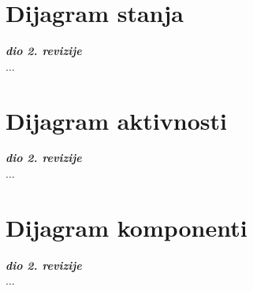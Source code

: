 			\eject
		
		\section{Dijagram stanja}
			
			
			\textbf{\textit{dio 2. revizije}}\\
			
			...
			
			
			\eject 
		
		\section{Dijagram aktivnosti}
			
			\textbf{\textit{dio 2. revizije}}\\
			
			...
			
			\eject
		\section{Dijagram komponenti}
		
			\textbf{\textit{dio 2. revizije}}\\
		
			...